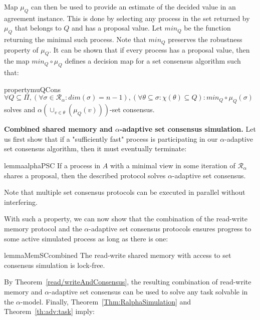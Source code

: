 \documentclass[a4paper]{article}
\newcommand{\myparagraph}[1]{\vspace{6pt}\noindent \textbf{#1}}
\def\R{\ensuremath{\mathcal{R}}}
\begin{document}
Map $\mu_Q$ can then be used to provide an estimate of the decided
value in an agreement instance.
This is done by selecting any process in the set returned by $\mu_Q$
that belongs to $Q$ and has a proposal value. 
Let ${\mathit{min}}_Q$ be the function returning the minimal such process.   
%
Note that ${\mathit{min}}_Q$ preserves
the robustness property of $\mu_Q$. 
%
It can be shown that if every process has a proposal value, 
then the map ${\mathit{min}}_Q \circ \mu_Q$ defines a decision
map for a set consensus algorithm such that:
\begin{restatable}{property}{muQCons}{\label{muQ_set-consensus}}
$\forall Q\subseteq\Pi, (\forall \sigma\in\R_\alpha:{\mathit{dim}}(\sigma)= n-1),
(\forall \theta\subseteq\sigma: \chi(\theta)\subseteq Q): {\mathit{min}}_Q \circ \mu_Q(\sigma)$ solves and $\alpha(\cup_{v\in\theta}(\mu_Q(v)))$-set consensus.
\end{restatable}

\myparagraph{Combined shared memory and $\alpha$-adaptive set consensus simulation.}
Let us first show that if a "sufficiently fast" process is participating 
in our $\alpha$-adaptive set consensus algorithm, then it must eventually 
terminate:
\begin{restatable}{lemma}{alphaPSC}{\label{AgreementProgress}}
If a process in $A$ with a minimal view in some iteration of $\R_\alpha$ shares a 
proposal, then the described protocol solves $\alpha$-adaptive set consensus.
\end{restatable}

\noindent Note that multiple set consensus protocols can be executed 
in parallel without interfering. 

With such a property, we can now show that the combination of the
read-write memory protocol and the $\alpha$-adaptive set consensus
protocols ensures progress to some active simulated process
as long as there is one:
%
\begin{restatable}{lemma}{MemSCcombined}
The read-write shared memory with access to set consensus simulation is lock-free.
\end{restatable}
%
By Theorem~\ref{read/writeAndConsensus}, the resulting combination of
read-write memory and $\alpha$-adaptive set consensus can be used to solve 
any task solvable in the $\alpha$-model.
Finally, Theorem~\ref{Thm:RalphaSimulation} and
Theorem~\ref{th:adv:task} imply:
\end{document}
